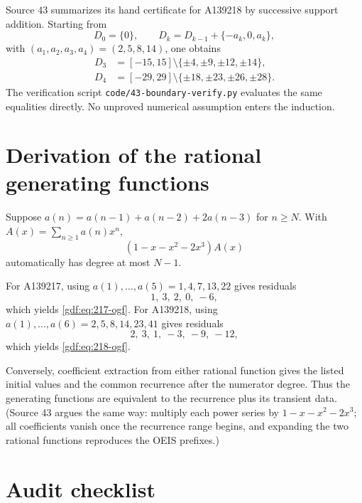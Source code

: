 \documentclass[11pt,a4paper]{article}
\numberwithin{equation}{section}
\theoremstyle{definition}
\theoremstyle{remark}
\theoremstyle{plain}
\newcommand{\file}[1]{\nolinkurl{#1}}
\begin{document}
Source 43 summarizes its hand certificate for A139218 by successive support
addition.  Starting from
\[
 D_0=\{0\},\qquad
 D_{k}=D_{k-1}+\{-a_k,0,a_k\},
\]
with $(a_1,a_2,a_3,a_4)=(2,5,8,14)$, one obtains
\begin{align*}
 D_3&=[-15,15]\setminus\{\pm4,\pm9,\pm12,\pm14\},\\
 D_4&=[-29,29]\setminus\{\pm18,\pm23,\pm26,\pm28\}.
\end{align*}
The verification script \file{code/43-boundary-verify.py} evaluates the
same equalities directly.  No unproved numerical assumption enters the
induction.

\section{Derivation of the rational generating functions}\label{gdf:app:gf}

Suppose $a(n)=a(n-1)+a(n-2)+2a(n-3)$ for $n\ge N$.  With
$A(x)=\sum_{n\ge1}a(n)x^n$,
\[
 (1-x-x^2-2x^3)A(x)
\]
automatically has degree at most $N-1$.

For A139217, using $a(1),\dots,a(5)=1,4,7,13,22$ gives residuals
\[
 1,\ 3,\ 2,\ 0,\ -6,
\]
which yields \eqref{gdf:eq:217-ogf}.  For A139218, using
$a(1),\dots,a(6)=2,5,8,14,23,41$ gives residuals
\[
 2,\ 3,\ 1,\ -3,\ -9,\ -12,
\]
which yields \eqref{gdf:eq:218-ogf}.

Conversely, coefficient extraction from either rational function gives the
listed initial values and the common recurrence after the numerator degree.
Thus the generating functions are equivalent to the recurrence plus its
transient data.  (Source 43 argues the same way: multiply each power series
by $1-x-x^2-2x^3$; all coefficients vanish once the recurrence range begins,
and expanding the two rational functions reproduces the OEIS prefixes.)

\section{Audit checklist}\label{gdf:app:checklist}
\end{document}
